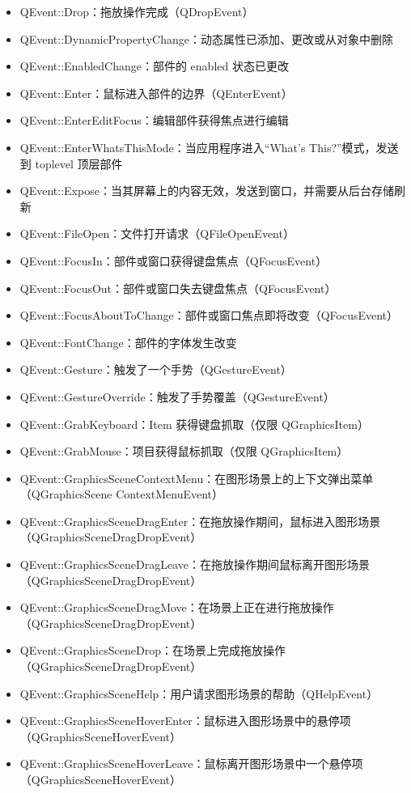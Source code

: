 \begin{itemize}
\item{QEvent::Drop：拖放操作完成（QDropEvent）}
\item{QEvent::DynamicPropertyChange：动态属性已添加、更改或从对象中删除}
\item{QEvent::EnabledChange：部件的 enabled 状态已更改}
\item{QEvent::Enter：鼠标进入部件的边界（QEnterEvent）}
\item{QEvent::EnterEditFocus：编辑部件获得焦点进行编辑}
\item{QEvent::EnterWhatsThisMode：当应用程序进入“What’s This?”模式，发送到 toplevel 顶层部件}
\item{QEvent::Expose：当其屏幕上的内容无效，发送到窗口，并需要从后台存储刷新}
\item{QEvent::FileOpen：文件打开请求（QFileOpenEvent）}
\item{QEvent::FocusIn：部件或窗口获得键盘焦点（QFocusEvent）}
\item{QEvent::FocusOut：部件或窗口失去键盘焦点（QFocusEvent）}
\item{QEvent::FocusAboutToChange：部件或窗口焦点即将改变（QFocusEvent）}
\item{QEvent::FontChange：部件的字体发生改变}
\item{QEvent::Gesture：触发了一个手势（QGestureEvent）}
\item{QEvent::GestureOverride：触发了手势覆盖（QGestureEvent）}
\item{QEvent::GrabKeyboard：Item 获得键盘抓取（仅限 QGraphicsItem）}
\item{QEvent::GrabMouse：项目获得鼠标抓取（仅限 QGraphicsItem）}
\item{QEvent::GraphicsSceneContextMenu：在图形场景上的上下文弹出菜单（QGraphicsScene ContextMenuEvent）}
\item{QEvent::GraphicsSceneDragEnter：在拖放操作期间，鼠标进入图形场景（QGraphicsSceneDragDropEvent）}
\item{QEvent::GraphicsSceneDragLeave：在拖放操作期间鼠标离开图形场景（QGraphicsSceneDragDropEvent）}
\item{QEvent::GraphicsSceneDragMove：在场景上正在进行拖放操作（QGraphicsSceneDragDropEvent）}
\item{QEvent::GraphicsSceneDrop：在场景上完成拖放操作（QGraphicsSceneDragDropEvent）}
\item{QEvent::GraphicsSceneHelp：用户请求图形场景的帮助（QHelpEvent）}
\item{QEvent::GraphicsSceneHoverEnter：鼠标进入图形场景中的悬停项（QGraphicsSceneHoverEvent）}
\item{QEvent::GraphicsSceneHoverLeave：鼠标离开图形场景中一个悬停项（QGraphicsSceneHoverEvent）}

\end{itemize}
